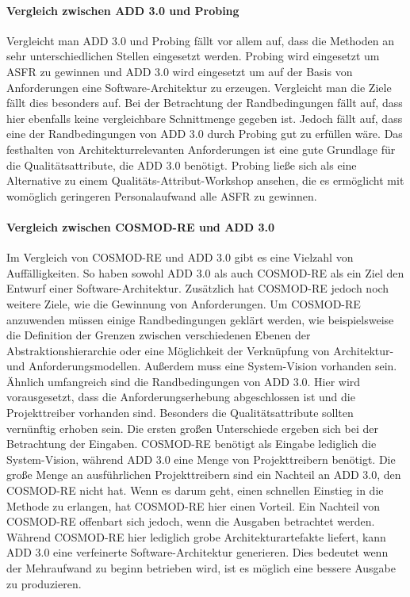 \paragraph{Vergleich zwischen ADD 3.0 und Probing}
Vergleicht man ADD 3.0 und Probing fällt vor allem auf, dass die Methoden an sehr unterschiedlichen Stellen eingesetzt werden. Probing wird eingesetzt um ASFR zu gewinnen und ADD 3.0 wird eingesetzt um auf der Basis von Anforderungen eine Software-Architektur zu erzeugen. Vergleicht man die Ziele fällt dies besonders auf. Bei der Betrachtung der Randbedingungen fällt auf, dass hier ebenfalls keine vergleichbare Schnittmenge gegeben ist. Jedoch fällt auf, dass eine der Randbedingungen von ADD 3.0 durch Probing gut zu erfüllen wäre. Das festhalten von Architekturrelevanten Anforderungen ist eine gute Grundlage für die Qualitätsattribute, die ADD 3.0 benötigt. Probing ließe sich als eine Alternative zu einem Qualitäts-Attribut-Workshop ansehen, die es ermöglicht mit womöglich geringeren Personalaufwand alle ASFR zu gewinnen. \\

\paragraph{Vergleich zwischen COSMOD-RE und ADD 3.0}
Im Vergleich von COSMOD-RE und ADD 3.0 gibt es eine Vielzahl von Auffälligkeiten. So haben sowohl ADD 3.0 als auch COSMOD-RE als ein Ziel den Entwurf einer Software-Architektur. Zusätzlich hat COSMOD-RE jedoch noch weitere Ziele, wie die Gewinnung von Anforderungen. Um COSMOD-RE anzuwenden müssen einige Randbedingungen geklärt werden, wie beispielsweise die Definition der Grenzen zwischen verschiedenen Ebenen der Abstraktionshierarchie oder eine Möglichkeit der Verknüpfung von Architektur- und Anforderungsmodellen. Außerdem muss eine System-Vision vorhanden sein. Ähnlich umfangreich sind die Randbedingungen von ADD 3.0. Hier wird vorausgesetzt, dass die Anforderungserhebung abgeschlossen ist und die Projekttreiber vorhanden sind. Besonders die Qualitätsattribute sollten vernünftig erhoben sein. Die ersten großen Unterschiede ergeben sich bei der Betrachtung der Eingaben. COSMOD-RE benötigt als Eingabe lediglich die System-Vision, während ADD 3.0 eine Menge von Projekttreibern benötigt. Die große Menge an ausführlichen Projekttreibern sind ein Nachteil an ADD 3.0, den COSMOD-RE nicht hat. Wenn es darum geht, einen schnellen Einstieg in die Methode zu erlangen, hat COSMOD-RE hier einen Vorteil. Ein Nachteil von COSMOD-RE offenbart sich jedoch, wenn die Ausgaben betrachtet werden. Während COSMOD-RE hier lediglich grobe Architekturartefakte liefert, kann ADD 3.0 eine verfeinerte Software-Architektur generieren. Dies bedeutet wenn der Mehraufwand zu beginn betrieben wird, ist es möglich eine bessere Ausgabe zu produzieren. \\

